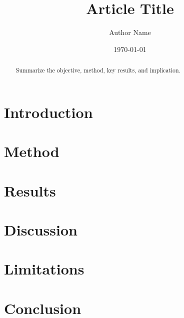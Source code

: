 \documentclass[11pt,letterpaper]{article}
\title{Article Title}
\author{Author Name}
\date{\today}
\begin{document}
\maketitle

\begin{abstract}
Summarize the objective, method, key results, and implication.
\end{abstract}

\section{Introduction}
\section{Method}
\section{Results}
\section{Discussion}
\section{Limitations}
\section{Conclusion}

% 
% 
\end{document}
